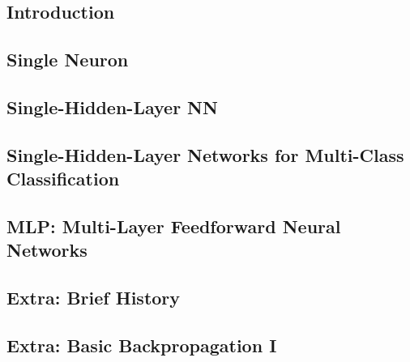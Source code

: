 \subsection{Introduction}


\subsection{Single Neuron}


\subsection{Single-Hidden-Layer NN}


\subsection{Single-Hidden-Layer Networks for Multi-Class Classification}


\subsection{MLP: Multi-Layer Feedforward Neural Networks}


%

\subsection{Extra: Brief History}


\subsection{Extra: Basic Backpropagation I}

